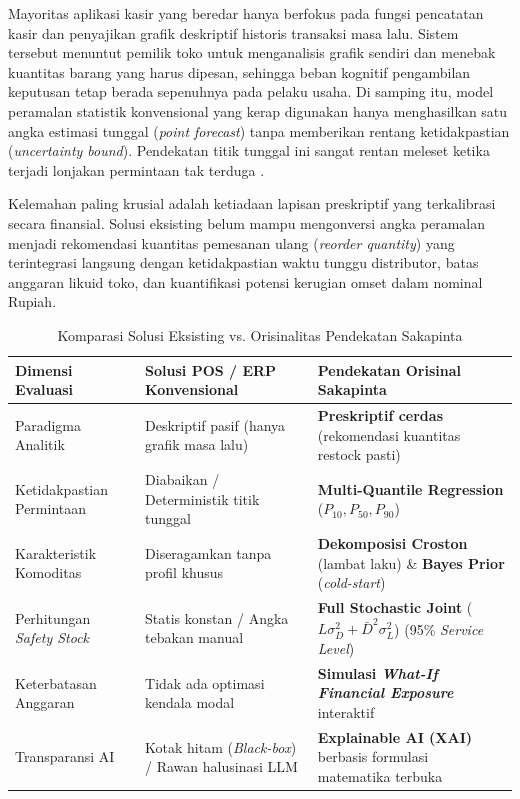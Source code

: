 \documentclass[12pt,a4paper]{article}
\begin{document}
Mayoritas aplikasi kasir yang beredar hanya berfokus pada fungsi pencatatan kasir dan penyajikan grafik deskriptif historis transaksi masa lalu. Sistem tersebut menuntut pemilik toko untuk menganalisis grafik sendiri dan menebak kuantitas barang yang harus dipesan, sehingga beban kognitif pengambilan keputusan tetap berada sepenuhnya pada pelaku usaha. Di samping itu, model peramalan statistik konvensional yang kerap digunakan hanya menghasilkan satu angka estimasi tunggal (\textit{point forecast}) tanpa memberikan rentang ketidakpastian (\textit{uncertainty bound}). Pendekatan titik tunggal ini sangat rentan meleset ketika terjadi lonjakan permintaan tak terduga \citep{hyndman2021forecasting}.

Kelemahan paling krusial adalah ketiadaan lapisan preskriptif yang terkalibrasi secara finansial. Solusi eksisting belum mampu mengonversi angka peramalan menjadi rekomendasi kuantitas pemesanan ulang (\textit{reorder quantity}) yang terintegrasi langsung dengan ketidakpastian waktu tunggu distributor, batas anggaran likuid toko, dan kuantifikasi potensi kerugian omset dalam nominal Rupiah.

\begin{table}[H]
    \centering
    \caption{Komparasi Solusi Eksisting vs. Orisinalitas Pendekatan Sakapinta}
    \label{tab:komparasi_solusi}
    \small
    \begin{tabularx}{\textwidth}{lXX}
        \toprule
        \textbf{Dimensi Evaluasi} & \textbf{Solusi POS / ERP Konvensional} & \textbf{Pendekatan Orisinal Sakapinta} \\
        \midrule
        Paradigma Analitik & Deskriptif pasif (hanya grafik masa lalu) & \textbf{Preskriptif cerdas} (rekomendasi kuantitas restock pasti) \\
        Ketidakpastian Permintaan & Diabaikan / Deterministik titik tunggal & \textbf{Multi-Quantile Regression} ($P_{10}, P_{50}, P_{90}$) \\
        Karakteristik Komoditas & Diseragamkan tanpa profil khusus & \textbf{Dekomposisi Croston} (lambat laku) \& \textbf{Bayes Prior} (\textit{cold-start}) \\
        Perhitungan \textit{Safety Stock} & Statis konstan / Angka tebakan manual & \textbf{Full Stochastic Joint} ($L \sigma_D^2 + \bar{D}^2 \sigma_L^2$) (95\% \textit{Service Level}) \\
        Keterbatasan Anggaran & Tidak ada optimasi kendala modal & \textbf{Simulasi \textit{What-If Financial Exposure}} interaktif \\
        Transparansi AI & Kotak hitam (\textit{Black-box}) / Rawan halusinasi LLM & \textbf{Explainable AI (XAI)} berbasis formulasi matematika terbuka \\
        \bottomrule
    \end{tabularx}
\end{table}
\end{document}
